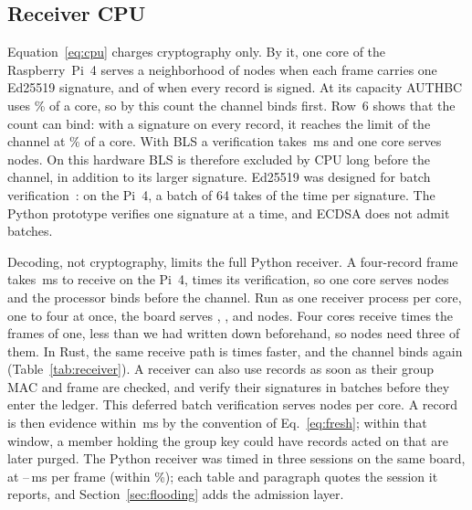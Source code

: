 \documentclass[lineno,pdflatex,sn-mathphys-num]{sn-jnl}
\renewcommand{\_}{\authbcunderscore\allowbreak}
\begin{document}
\subsection{Receiver CPU}\label{sec:cpu}
Equation~\eqref{eq:cpu} charges cryptography only. By it, one core of the Raspberry~Pi~4 serves a
neighborhood of \ncpuBatch{} nodes when each frame carries one Ed25519 signature, and of
\ncpuInline{} when every record is signed. At its capacity AUTHBC uses \cpuLeanDesign\% of a
core, so by this count the channel binds first. Row~6 shows that the count can bind: with a
signature on every record, it reaches the limit of the channel at \cpuLeanInline\% of a core.
With BLS a verification takes \tVerBls\,ms and one core serves \ncpuBls{} nodes. On this
hardware BLS is therefore excluded by CPU long before the channel, in addition to its larger
signature. Ed25519 was designed for batch verification~\cite{ed25519}: on the Pi~4, a batch of 64
takes \edBatchRatio{} of the time per signature. The Python prototype verifies one signature at
a time, and ECDSA does not admit batches.

Decoding, not cryptography, limits the full Python receiver. A four-record frame takes
\leanRecvMs\,ms to receive on the Pi~4, \leanRecvOverVerify{} times its verification, so one core
serves \ncpuProto{} nodes and the processor binds before the channel. Run as one receiver process
per core, one to four at once, the board serves \mcNodesOne, \mcNodesTwo, \mcNodesThree{} and
\mcNodesFour{} nodes.
Four cores receive \mcScaleFour{} times the frames of one, less than we had written down
beforehand, so \nmaxLeanDesign{} nodes need three of them.
In Rust, the same receive path is \rxSpeedup{} times faster, and the channel binds again
(Table~\ref{tab:receiver}). A receiver can also use records as soon as their group MAC and frame
are checked, and verify their signatures in batches before they enter the ledger. This deferred
batch verification serves \rxLazyNodes{} nodes per core. A record is then evidence within
\rxEvidenceMs\,ms by the convention of Eq.~\eqref{eq:fresh}; within that window, a member holding
the group key could have records acted on that are later purged.
The Python receiver was timed in three sessions on the same board, at
\pyRecvLo--\pyRecvHi\,ms per frame (within \pyRecvSpreadPct\%); each table and paragraph quotes
the session it reports, and Section~\ref{sec:flooding} adds the admission layer.
\end{document}
